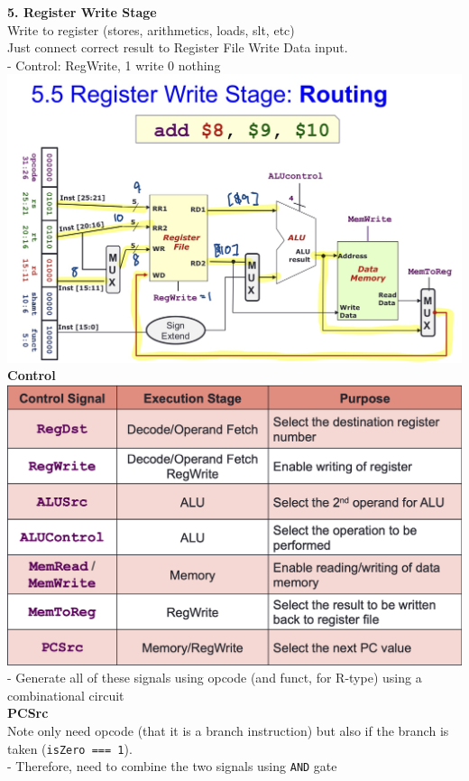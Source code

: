 \documentclass[10pt, a4paper]{article}
\begin{document}
\begin{multicols*}{3}
		\textbf{5. Register Write Stage}\\
		Write to register (stores, arithmetics, loads, slt, etc)\\
		Just connect correct result to Register File Write Data input.\\
		- Control: RegWrite, 1 write 0 nothing\\
		\includegraphics[scale=0.16]{./assets/regWrite}\\
		
		{\normalsize\textbf{Control}}\\
		\includegraphics[scale=.26]{./assets/controlSignals}\\
		- Generate all of these signals using opcode (and funct, for R-type) using a combinational circuit\\
		
		\textbf{PCSrc}\\
		Note only need opcode (that it is a branch instruction) but also if the branch is taken (\texttt{isZero === 1}).\\
		- Therefore, need to combine the two signals using \texttt{AND} gate\\
		

\end{multicols*}
\end{document}
